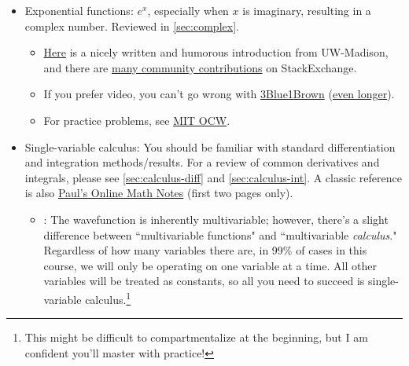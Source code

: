 \begin{itemize}
	\item Exponential functions: $e^x$, especially when $x$ is imaginary, resulting in a complex number.
	Reviewed in \autoref{sec:complex}.
	
	\begin{itemize}
		\item \href{https://people.math.wisc.edu/~angenent/Free-Lecture-Notes/freecomplexnumbers.pdf}{Here} is a nicely written and humorous introduction from UW-Madison, and there are \href{https://physics.stackexchange.com/questions/307492/significance-of-complex-exponential-representation-of-waves}{many community contributions} on StackExchange.
		
		\item If you prefer video, you can't go wrong with \href{https://www.youtube.com/watch?v=v0YEaeIClKY\&list=PLZHQObOWTQDNPOjrT6KVlfJuKtYTftqH6}{3Blue1Brown} (\href{https://www.youtube.com/watch?v=5PcpBw5Hbwo\&list=PLZHQObOWTQDP5CVelJJ1bNDouqrAhVPev}{even longer}).
		
		\item For practice problems, see \href{https://ocw.mit.edu/courses/18-03sc-differential-equations-fall-2011/pages/unit-i-first-order-differential-equations/complex-arithmetic-and-exponentials/}{MIT OCW}.
	\end{itemize}
	
	\item Single-variable calculus: You should be familiar with standard differentiation and integration methods/results. 
	For a review of common derivatives and integrals, please see \autoref{sec:calculus-diff} and \ref{sec:calculus-int}.
	A classic reference is also  \href{https://tutorial.math.lamar.edu/pdf/common_derivatives_integrals.pdf}{Paul's Online Math Notes} (first two pages only).
	
	\begin{itemize}
		\item {}: The wavefunction is inherently multivariable; however, there's a slight difference between ``multivariable functions" and ``multivariable \emph{calculus}."
		Regardless of how many variables there are, in 99\% of cases in this course, we will only be operating on one variable at a time.
		All other variables will be treated as constants, so all you need to succeed is single-variable calculus.\footnote{This might be difficult to compartmentalize at the beginning, but I am confident you'll master with practice!}
		

\end{itemize}
\end{itemize}

